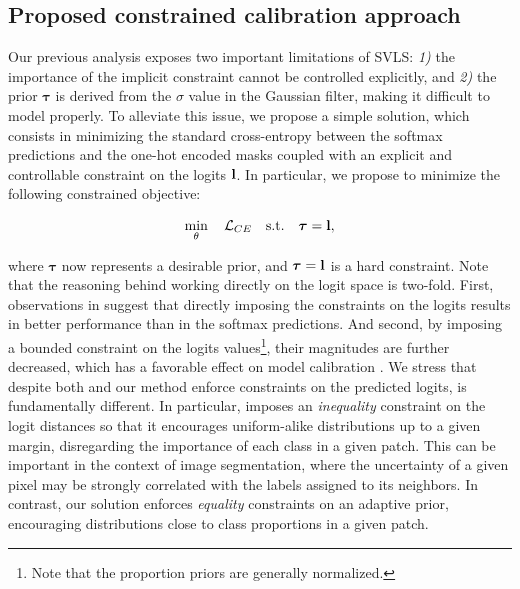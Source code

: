\documentclass[twocolumn,final,10pt]{elsarticle}
\begin{document}
\subsection{Proposed constrained calibration approach}
\label{ssec:ours}

Our previous analysis exposes two important limitations of SVLS: \textit{1)} the importance of the implicit constraint cannot be controlled explicitly, and \textit{2)} the prior $\bm{\tau}$ is derived from the $\sigma$ value in the Gaussian filter, making it difficult to model properly. 
To alleviate this issue, we propose a simple solution, which consists in minimizing the standard cross-entropy between the softmax predictions and the one-hot encoded masks coupled with an explicit and controllable constraint on the logits ${\mathbf{l}}$. In particular, we propose to minimize the following constrained objective:


\begin{align}
\label{eq:proposed-constrained}
\min_{\theta} \quad \mathcal{L}_{CE} \quad \textrm{s.t.} \quad  \bm{\tau} = \rvl, %
\end{align}

\noindent where $\bm{\tau}$ now represents a desirable prior, and $\bm{\tau} = {\mathbf{l}} $ is a hard constraint. Note that the reasoning behind working directly on the logit space is two-fold. First, observations in \cite{liu2022devil} suggest that directly imposing the constraints on the logits %
results in better performance than in the softmax predictions. And second, by imposing a bounded constraint on the logits values\footnote{Note that the proportion priors are generally normalized.}, their magnitudes are further decreased, which has a favorable effect on model calibration \cite{muller2019does}. We stress that despite both \cite{liu2022devil} and our method enforce constraints on the predicted logits, \cite{liu2022devil} is fundamentally different. %
In particular, \cite{liu2022devil} imposes an \textit{inequality} constraint on the logit distances so that it encourages uniform-alike distributions up to a given margin, disregarding the importance of each class in a given patch. %
This can be important in the context of image segmentation, where %
the uncertainty of a given pixel may be strongly correlated with the labels assigned to its neighbors. In contrast, our solution enforces \textit{equality} constraints on an adaptive prior, encouraging distributions close to class proportions in a given patch.     
\end{document}
